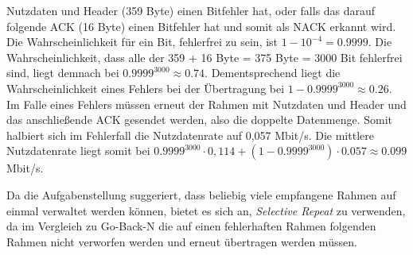 \documentclass{../exercisesheet}
\begin{document}
\begin{exercise}{4}
\begin{subexercise}
	Nutzdaten und Header (359 Byte) einen Bitfehler hat, oder falls das darauf folgende ACK (16 Byte) einen Bitfehler hat und somit als NACK erkannt wird. Die Wahrscheinlichkeit
	für ein Bit, fehlerfrei zu sein, ist $1-10^{-4}=0.9999$. Die Wahrscheinlichkeit, dass alle der 359 + 16 Byte = 375 Byte = 3000 Bit fehlerfrei sind, liegt demnach bei
	$0.9999^{3000}\approx 0.74$. Dementsprechend liegt die Wahrscheinlichkeit eines Fehlers bei der Übertragung bei $1-0.9999^{3000}\approx 0.26$. Im Falle eines Fehlers
	müssen erneut der Rahmen mit Nutzdaten und Header und das anschließende ACK gesendet werden, also die doppelte Datenmenge. Somit halbiert sich im Fehlerfall
	die Nutzdatenrate auf 0,057 Mbit/s. Die mittlere Nutzdatenrate liegt somit bei $0.9999^{3000} \cdot 0,114 + (1-0.9999^{3000}) \cdot 0.057 \approx 0.099$ Mbit/s.
\end{subexercise}
\begin{subexercise}
	Da die Aufgabenstellung suggeriert, dass beliebig viele empfangene Rahmen auf einmal verwaltet werden können, bietet es sich an, \textit{Selective Repeat} zu verwenden,
	da im Vergleich zu Go-Back-N die auf einen fehlerhaften Rahmen folgenden Rahmen nicht verworfen werden und erneut übertragen werden müssen.
\end{subexercise}
\end{exercise}

\begin{exercise}{2.5}
\begin{subexercise}

\end{subexercise}
\begin{subexercise}
	
\end{subexercise}
\end{exercise}

\begin{exercise}{1.5}
\begin{subexercise}
	
\end{subexercise}
\begin{subexercise}
	
\end{subexercise}
\begin{subexercise}
	
\end{subexercise}
\end{exercise}
\end{document}
